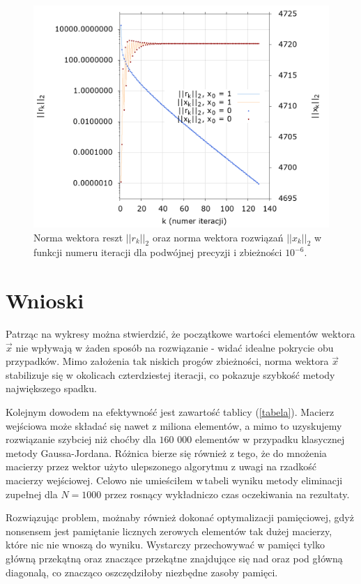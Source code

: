 \newpage
\begin{figure}[h!]
	\begin{center}
		\includegraphics[height=0.6\linewidth]{double.png}
		\caption{Norma wektora reszt $ ||r_k||_2 $ oraz norma wektora rozwiązań $ ||x_k||_2 $ w funkcji numeru iteracji dla podwójnej precyzji i zbieżności $ 10^{-6} $.}
	\end{center}
	\label{double}
\end{figure}
\section{Wnioski}

Patrząc na wykresy można stwierdzić, że początkowe wartości elementów wektora $ \vec{x} $ nie wpływają w żaden sposób na rozwiązanie - widać idealne pokrycie obu przypadków. Mimo założenia tak niskich progów zbieżności, norma wektora $ \vec{x} $ stabilizuje się w okolicach czterdziestej iteracji, co pokazuje szybkość metody największego spadku.

Kolejnym dowodem na efektywność jest zawartość tablicy (\ref{tabela}). Macierz wejściowa może składać się nawet z miliona elementów, a mimo to uzyskujemy rozwiązanie szybciej niż choćby dla $ 160 $ $ 000 $ elementów w przypadku klasycznej metody Gaussa-Jordana. Różnica bierze się również z tego, że do mnożenia macierzy przez wektor użyto ulepszonego algorytmu z uwagi na rzadkość macierzy wejściowej. Celowo nie umieściłem w\,tabeli wyniku metody eliminacji zupełnej dla $ N = 1000 $ przez rosnący wykładniczo czas oczekiwania na rezultaty.

Rozwiązując problem, możnaby również dokonać optymalizacji pamięciowej, gdyż nonsensem jest pamiętanie licznych zerowych elementów tak dużej macierzy, które nic nie wnoszą do wyniku. Wystarczy przechowywać w pamięci tylko główną przekątną oraz znaczące przekątne znajdujące się nad oraz pod główną diagonalą, co znacząco oszczędziłoby niezbędne zasoby pamięci.



